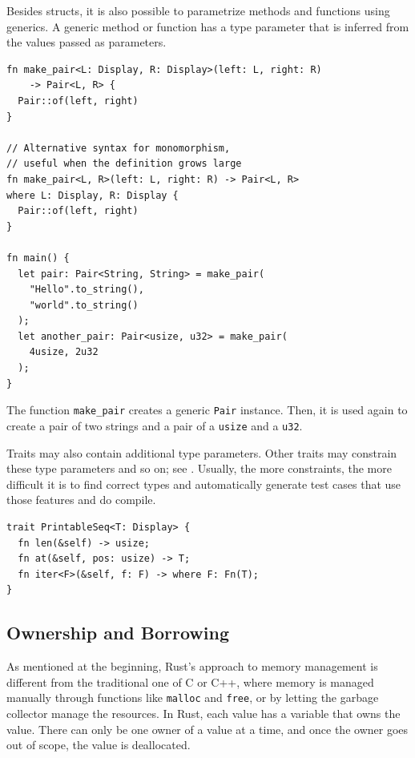 \documentclass[paper=a4,%
  twoside,%
  BCOR4mm,%
  abstract=true,%
  toc=bibliography,%
  chapterprefix=true,%
  toc=bibliographynumbered,%
  open=right,%
  english,%
  pagesize=pdftex]{scrreprt}
\begin{document}
Besides structs, it is also possible to parametrize methods and functions using generics. A generic method or function has a type parameter that is inferred from the values passed as parameters.
\begin{lstlisting}[style=boxed, caption={Variants of defining a generic function}, label=lst:function-monomorphization]
fn make_pair<L: Display, R: Display>(left: L, right: R)
    -> Pair<L, R> {
  Pair::of(left, right)
}

// Alternative syntax for monomorphism,
// useful when the definition grows large
fn make_pair<L, R>(left: L, right: R) -> Pair<L, R>
where L: Display, R: Display {
  Pair::of(left, right)
}

fn main() {
  let pair: Pair<String, String> = make_pair(
    "Hello".to_string(),
    "world".to_string()
  );
  let another_pair: Pair<usize, u32> = make_pair(
    4usize, 2u32
  );
}
\end{lstlisting}

The function \texttt{make\string_pair} creates a generic \texttt{Pair} instance. Then, it is used again to create a pair of two strings and a pair of a \texttt{usize} and a \texttt{u32}.

Traits may also contain additional type parameters. Other traits may constrain these type parameters and so on; see . Usually, the more constraints, the more difficult it is to find correct types and automatically generate test cases that use those features and do compile.

\begin{lstlisting}[style=boxed, caption={Type parameters can be specified for a trait to make it generic. These appear after the trait name, using the same syntax used in generic functions}, label=lst:traits-with-type-bounds]
trait PrintableSeq<T: Display> {
  fn len(&self) -> usize;
  fn at(&self, pos: usize) -> T;
  fn iter<F>(&self, f: F) -> where F: Fn(T);
}
\end{lstlisting}

\subsection{Ownership and Borrowing}
As mentioned at the beginning, Rust's approach to memory management is different from the traditional one of C or C++, where memory is managed manually through functions like \texttt{malloc} and \texttt{free}, or by letting the garbage collector manage the resources. In Rust, each value has a variable that owns the value. There can only be one owner of a value at a time, and once the owner goes out of scope, the value is deallocated.
\end{document}
